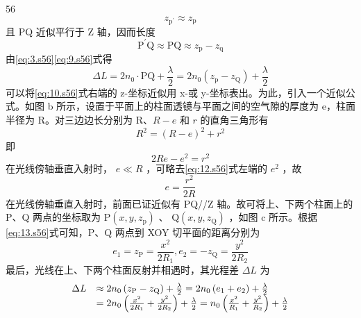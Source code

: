 \begin{solution}{56}
\begin{equation}
        z _ {\mathrm{p^{\prime}}} \approx z _ {\mathrm{p}}
        \label{eq:8.s56}
    \end{equation}
    且 PQ 近似平行于 Z 轴，因而长度
    \begin{equation}
        \mathrm{P^{\prime}Q} \approx \mathrm{PQ} \approx z _ {\mathrm{p}} - z _ {\mathrm{q}}
        \label{eq:9.s56}
    \end{equation}
    由\eqref{eq:3.s56}\eqref{eq:9.s56}式得
    \begin{equation}
        \Delta L = 2 n _ {0} \cdot \mathrm{PQ} + \frac {\lambda}{2} = 2 n _ {0} \left(z _ {\mathrm{p}} - z _ {\mathrm{Q}}\right) + \frac {\lambda}{2}
        \label{eq:10.s56}
    \end{equation}
    可以将\eqref{eq:10.s56}式右端的 z-坐标近似用 x-或 y-坐标表出。为此，引入一个近似公式。如图 b 所示，设置于平面上的柱面透镜与平面之间的空气隙的厚度为 e，柱面半径为 R。对三边边长分别为 R、$R - e$ 和 $r$ 的直角三角形有
    \begin{equation}
        R^{2} = (R - e)^{2} + r^{2}
        \label{eq:11.s56}
    \end{equation}
    即
    \begin{equation}
        2 R e - e^{2} = r^{2}
        \label{eq:12.s56}
    \end{equation}
    在光线傍轴垂直入射时， $e \ll R$ ，可略去\eqref{eq:12.s56}式左端的 $e^{2}$ ，故
    \begin{equation}
        e = \frac {r^{2}}{2 R}
        \label{eq:13.s56}
    \end{equation}
    在光线傍轴垂直入射时，前面已证近似有 PQ//Z 轴。故可将上、下两个柱面上的 P、Q 两点的坐标取为 $\mathrm{P}(x,y,z_{\mathrm{p}})$ 、 $\mathrm{Q}(x,y,z_{\mathrm{Q}})$ ，如图 c 所示。根据\eqref{eq:13.s56}式可知，P、Q 两点到 XOY 切平面的距离分别为
    \begin{equation}
        e _ {1} = z _ {\mathrm{P}} = \frac {x^{2}}{2 R _ {1}}, e _ {2} = - z _ {\mathrm{Q}} = \frac {y^{2}}{2 R _ {2}}
        \label{eq:14.s56}
    \end{equation}
    最后，光线在上、下两个柱面反射并相遇时，其光程差 $\Delta L$ 为
    \begin{equation}
        \begin{array}{r l}
            \Delta L & \approx 2 n _ {0} \left(z _ {\mathrm{P}} - z _ {\mathrm{Q}}\right) + \frac {\lambda}{2} = 2 n _ {0} \left(e _ {1} + e _ {2}\right) + \frac {\lambda}{2} \\
            & = 2 n _ {0} \left(\frac {x^{2}}{2 R _ {1}} + \frac {y^{2}}{2 R _ {2}}\right) + \frac {\lambda}{2} = n _ {0} \left(\frac {x^{2}}{R _ {1}} + \frac {y^{2}}{R _ {2}}\right) + \frac {\lambda}{2}

\end{array}
\end{equation}
\end{solution}
